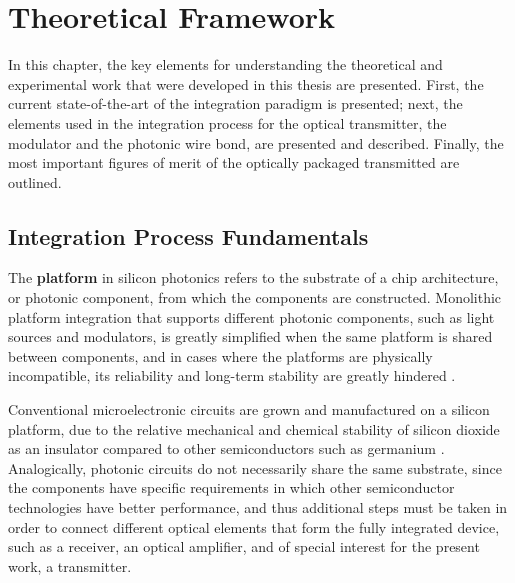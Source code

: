 
\chapter{Theoretical Framework}
\label{ch:theoreticalBackground}

In this chapter, the key elements for understanding the theoretical and experimental work that were developed in this thesis are presented. First, the current state-of-the-art of the integration paradigm is presented; next, the elements used in the integration process for the optical transmitter, the modulator and the photonic wire bond, are presented and described. Finally, the most important figures of merit of the optically packaged transmitted are outlined. 


\section{Integration Process Fundamentals}
\label{sec:thbkgd:fmwk}


The \textbf{platform} in silicon photonics refers to the substrate of a chip architecture, or photonic component, from which the components are constructed. Monolithic platform integration that supports different photonic components, such as light sources and modulators, is greatly simplified when the same platform is shared between components, and in cases where the platforms are physically incompatible, its reliability and long-term stability are greatly hindered \cite{heteroepiCrumbacker98}. 

Conventional microelectronic circuits are grown and manufactured on a silicon platform, due to the relative mechanical and chemical stability of silicon dioxide as an insulator compared to other semiconductors such as germanium \cite{SiGroFisher12}. Analogically, photonic circuits do not necessarily share the same substrate, since the components have specific requirements in which other semiconductor technologies have better performance, and thus additional steps must be taken in order to connect different optical elements that form the fully integrated device, such as a receiver, an optical amplifier, and of special interest for the present work, a transmitter. %

